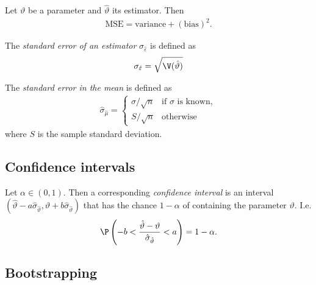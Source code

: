 \documentclass{article}
\begin{document}
\begin{theorem}
	Let $\vartheta$ be a parameter and $\hat\vartheta$ its estimator.
	Then
	\begin{align*}
		\text{MSE}=\text{variance}+(\text{bias})^2.
	\end{align*}
\end{theorem}

\begin{definition}
	The \emph{standard error of an estimator} $\sigma_{\hat\varepsilon}$
	is defined as
	\begin{align*}
		\sigma_{\hat\varepsilon}=\sqrt{\V(\hat\vartheta)}
	\end{align*}
\end{definition}

\begin{definition}
	The \emph{standard error in the mean} is defined as
	\begin{align*}
		\hat\sigma_{\hat\mu}=
		\begin{cases}
			\sigma/\sqrt{n} & \text{if $\sigma$ is known}, \\
			S/\sqrt{n}      & \text{otherwise}
		\end{cases}
	\end{align*}
	where $S$ is the sample standard deviation.
\end{definition}

\subsection{Confidence intervals}

\begin{definition}
	Let $\alpha\in(0,1)$. Then a corresponding \emph{confidence interval}
	is an interval $(\hat\vartheta-a\hat\sigma_{\hat\vartheta}, \hat\vartheta+b\hat\sigma_{\hat\vartheta})$
	that has the chance $1-\alpha$ of containing the parameter $\vartheta$.
	I.e.
	\begin{align*}
		\P\left(-b < \frac{\hat\vartheta-\vartheta}{\hat\sigma_{\hat\vartheta}}<a\right) = 1-\alpha.
	\end{align*}
\end{definition}

\subsection{Bootstrapping}
\end{document}

